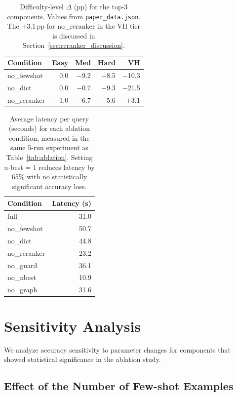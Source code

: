 \documentclass{npj-compt.mater}
\begin{document}
\begin{table}[t]
\centering
\caption{Difficulty-level $\Delta$ (pp) for the top-3 components.
Values from \texttt{paper\_data.json}.
The $+$3.1\,pp for no\_reranker in the VH tier is discussed in
Section~\ref{sec:reranker_discussion}.}
\label{tab:ablation-detail}
\small
\begin{tabular}{@{}lrrrr@{}}
\toprule
Condition & Easy & Med & Hard & VH \\
\midrule
no\_fewshot   &    0.0  & $-$9.2  & $-$8.5  & $-$10.3 \\
no\_dict      &    0.0  & $-$0.7  & $-$9.3  & $-$21.5 \\
no\_reranker  & $-$1.0  & $-$6.7  & $-$5.6  & $+$3.1  \\
\bottomrule
\end{tabular}
\end{table}

\begin{table}[t]
\centering
\caption{Average latency per query (seconds) for each ablation
condition, measured in the same 5-run experiment as
Table~\ref{tab:ablation}.
Setting $n$-best = 1 reduces latency by 65\% with no statistically
significant accuracy loss.}
\label{tab:latency}
\small
\begin{tabular}{@{}lr@{}}
\toprule
Condition & Latency (s) \\
\midrule
full & 31.0 \\
no\_fewshot & 50.7 \\
no\_dict & 44.8 \\
no\_reranker & 23.2 \\
no\_guard & 36.1 \\
no\_nbest & 10.9 \\
no\_graph & 31.6 \\
\bottomrule
\end{tabular}
\end{table}

\section{Sensitivity Analysis}
\label{sec:sensitivity}

We analyze accuracy sensitivity to parameter changes for
components that showed statistical significance in the ablation study.

\subsection{Effect of the Number of Few-shot Examples}
\label{sec:fewshot_sensitivity}
\end{document}
